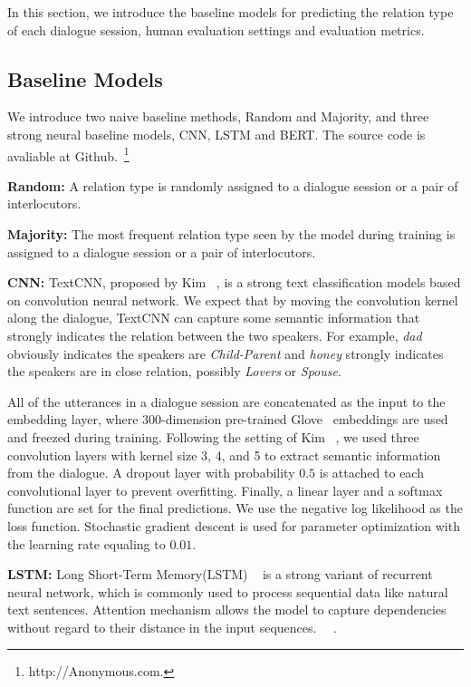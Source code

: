 In this section, we introduce the baseline models for predicting the relation type of each dialogue session, human evaluation settings and evaluation metrics.

\subsection{Baseline Models}
We introduce two naive baseline methods, Random and Majority, and three strong neural
baseline models, CNN, LSTM and BERT. 
The source code is avaliable at Github.~\footnote{http://Anonymous.com.}

\textbf{Random:} A relation type is randomly assigned to a dialogue session or a pair of interlocutors.

\textbf{Majority:} The most frequent relation type seen by the model during training
is assigned to a dialogue session or a pair of interlocutors.

\textbf{CNN:}
TextCNN, proposed by Kim ~\cite{Kim14}, is a strong text classification models 
based on convolution neural network. We expect that by moving the convolution
kernel along the dialogue, TextCNN can capture some semantic information that strongly
indicates the relation between the two speakers. For example, \textit{dad} obviously indicates
the speakers are \textit{Child-Parent} and \textit{honey} strongly indicates the speakers are
in close relation, possibly \textit{Lovers} or \textit{Spouse}.

All of the utterances in a dialogue session are concatenated as the input to the 
embedding layer, where 300-dimension pre-trained Glove~\cite{pennington2014glove} 
embeddings are used and freezed 
during training. Following the setting of Kim ~\cite{Kim14}, we used three convolution layers
with kernel size 3, 4, and 5 to extract semantic information from the dialogue. A dropout layer with 
probability $0.5$ is attached to each convolutional layer to prevent overfitting.
Finally, a linear layer and a softmax function are set for the final predictions. 
We use the negative log likelihood as the loss function. Stochastic gradient descent is 
used for parameter optimization with the learning rate equaling to $0.01$. 

\textbf{LSTM:}
Long Short-Term Memory(LSTM) ~\cite{DBLP:LSTMs} is a strong variant of recurrent neural 
network, which is commonly used to process sequential data like natural text sentences.
Attention mechanism allows the model to capture dependencies without regard to their distance in the input sequences.
~\cite{DBLP:journals/corr/BahdanauCB14}~\cite{DBLP:conf/iclr/KimDHR17}.

